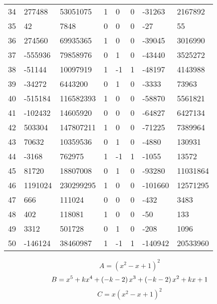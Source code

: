 \documentclass{amsart}
\begin{document}
\begin{longtable}{|l|l|l|lllll|}
34&277488&53051075&1&0&0&-31263&2167892\\
35&42&7848&0&0&0&-27&55\\
36&274560&69935365&1&0&0&-39045&3016990\\
37&-555936&79858976&0&1&0&-43440&3525272\\
38&-51144&10097919&1&-1&1&-48197&4143988\\
39&-34272&6443200&0&1&0&-3333&73963\\
40&-515184&116582393&1&0&0&-58870&5561821\\
41&-102432&14605920&0&0&0&-64827&6427134\\
42&503304&147807211&1&0&0&-71225&7389964\\
43&70632&10359536&0&1&0&-4880&130931\\
44&-3168&762975&1&-1&1&-1055&13572\\
45&81720&18807008&0&1&0&-93280&11031864\\
46&1191024&230299295&1&0&0&-101660&12571295\\
47&666&111024&0&0&0&-432&3483\\
48&402&118081&1&0&0&-50&133\\
49&3312&501728&0&1&0&-208&1096\\
50&-146124&38460987&1&-1&1&-140942&20533960\\
\hline
\end{longtable}
$$A=(x^2
 - x
 + 1)^{2}$$
$$B=x^5
 + k\*x^4
 + \left(-k
 - 2\right) \*x^3
 + \left(-k
 - 2\right) \*x^2
 + k\*x
 + 1$$
$$C=x(x^2
 - x
 + 1)^{2}$$
\end{document}
